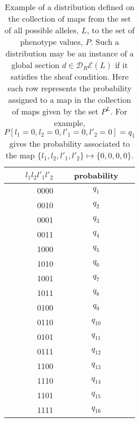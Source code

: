 \begin{table}
\centering
\begin{tabular}{ r || c }
$l_1 l_2 l'_1 l'_2$ & probability \\ \hline
0000 & $q_1$ \\
0010 & $q_2$ \\
0001 & $q_3$ \\
0011 & $q_4$ \\
1000 & $q_5$ \\
1010 & $q_6$ \\
1001 & $q_7$ \\
1011 & $q_8$ \\
0100 & $q_9$ \\
0110 & $q_{10}$ \\
0101 & $q_{11}$ \\
0111 & $q_{12}$ \\
1100 & $q_{13}$ \\
1110 & $q_{14}$ \\
1101 & $q_{15}$ \\
1111 & $q_{16}$
\end{tabular}
\caption{Example of a distribution defined on the collection of maps from the set of all possible alleles, $L$, to the set of phenotype values, $P$. Such a distribution may be an instance of a global section $d \in \mathcal{D}_R\mathcal{E}(L)$ if it satisfies the sheaf condition.  Here each row represents the probability assigned to a map in the collection of maps given by the set $P^L$. For example, $P[l_1=0,l_2=0,l'_1=0,l'_2=0]=q_1$ gives the probability associated to the map $\{l_1, l_2, l'_1, l'_2\} \mapsto \{0,0,0,0\}$.}
\label{tab:hidvarmod}
\end{table}